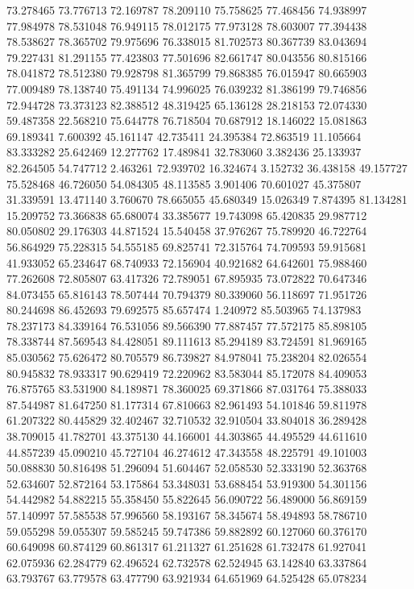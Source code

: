 73.278465
73.776713
72.169787
78.209110
75.758625
77.468456
74.938997
77.984978
78.531048
76.949115
78.012175
77.973128
78.603007
77.394438
78.538627
78.365702
79.975696
76.338015
81.702573
80.367739
83.043694
79.227431
81.291155
77.423803
77.501696
82.661747
80.043556
80.815166
78.041872
78.512380
79.928798
81.365799
79.868385
76.015947
80.665903
77.009489
78.138740
75.491134
74.996025
76.039232
81.386199
79.746856
72.944728
73.373123
82.388512
48.319425
65.136128
28.218153
72.074330
59.487358
22.568210
75.644778
76.718504
70.687912
18.146022
15.081863
69.189341
7.600392
45.161147
42.735411
24.395384
72.863519
11.105664
83.333282
25.642469
12.277762
17.489841
32.783060
3.382436
25.133937
82.264505
54.747712
2.463261
72.939702
16.324674
3.152732
36.438158
49.157727
75.528468
46.726050
54.084305
48.113585
3.901406
70.601027
45.375807
31.339591
13.471140
3.760670
78.665055
45.680349
15.026349
7.874395
81.134281
15.209752
73.366838
65.680074
33.385677
19.743098
65.420835
29.987712
80.050802
29.176303
44.871524
15.540458
37.976267
75.789920
46.722764
56.864929
75.228315
54.555185
69.825741
72.315764
74.709593
59.915681
41.933052
65.234647
68.740933
72.156904
40.921682
64.642601
75.988460
77.262608
72.805807
63.417326
72.789051
67.895935
73.072822
70.647346
84.073455
65.816143
78.507444
70.794379
80.339060
56.118697
71.951726
80.244698
86.452693
79.692575
85.657474
1.240972
85.503965
74.137983
78.237173
84.339164
76.531056
89.566390
77.887457
77.572175
85.898105
78.338744
87.569543
84.428051
89.111613
85.294189
83.724591
81.969165
85.030562
75.626472
80.705579
86.739827
84.978041
75.238204
82.026554
80.945832
78.933317
90.629419
72.220962
83.583044
85.172078
84.409053
76.875765
83.531900
84.189871
78.360025
69.371866
87.031764
75.388033
87.544987
81.647250
81.177314
67.810663
82.961493
54.101846
59.811978
61.207322
80.445829
32.402467
32.710532
32.910504
33.804018
36.289428
38.709015
41.782701
43.375130
44.166001
44.303865
44.495529
44.611610
44.857239
45.090210
45.727104
46.274612
47.343558
48.225791
49.101003
50.088830
50.816498
51.296094
51.604467
52.058530
52.333190
52.363768
52.634607
52.872164
53.175864
53.348031
53.688454
53.919300
54.301156
54.442982
54.882215
55.358450
55.822645
56.090722
56.489000
56.869159
57.140997
57.585538
57.996560
58.193167
58.345674
58.494893
58.786710
59.055298
59.055307
59.585245
59.747386
59.882892
60.127060
60.376170
60.649098
60.874129
60.861317
61.211327
61.251628
61.732478
61.927041
62.075936
62.284779
62.496524
62.732578
62.524945
63.142840
63.337864
63.793767
63.779578
63.477790
63.921934
64.651969
64.525428
65.078234
